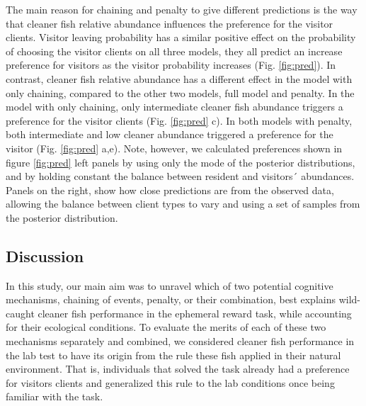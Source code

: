 \documentclass[10pt,letterpaper]{article}
\begin{document}
The main reason for chaining and penalty to give different predictions
is the way that cleaner fish relative abundance influences the
preference for the visitor clients. Visitor leaving probability has a
similar positive effect on the probability of choosing the visitor
clients on all three models, they all predict an increase preference for
visitors as the visitor probability increases (Fig. \ref{fig:pred}). In
contrast, cleaner fish relative abundance has a different effect in the
model with only chaining, compared to the other two models, full model
and penalty. In the model with only chaining, only intermediate cleaner
fish abundance triggers a preference for the visitor clients (Fig.
\ref{fig:pred} c). In both models with penalty, both intermediate and
low cleaner abundance triggered a preference for the visitor (Fig.
\ref{fig:pred} a,e). Note, however, we calculated preferences shown in
figure \ref{fig:pred} left panels by using only the mode of the
posterior distributions, and by holding constant the balance between
resident and visitors´ abundances. Panels on the right, show how close
predictions are from the observed data, allowing the balance between
client types to vary and using a set of samples from the posterior
distribution.

\hypertarget{discussion}{%
\subsection{Discussion}\label{discussion}}

In this study, our main aim was to unravel which of two potential
cognitive mechanisms, chaining of events, penalty, or their combination,
best explains wild-caught cleaner fish performance in the ephemeral
reward task, while accounting for their ecological conditions. To
evaluate the merits of each of these two mechanisms separately and
combined, we considered cleaner fish performance in the lab test to have
its origin from the rule these fish applied in their natural
environment. That is, individuals that solved the task already had a
preference for visitors clients and generalized this rule to the lab
conditions once being familiar with the task.
\end{document}
